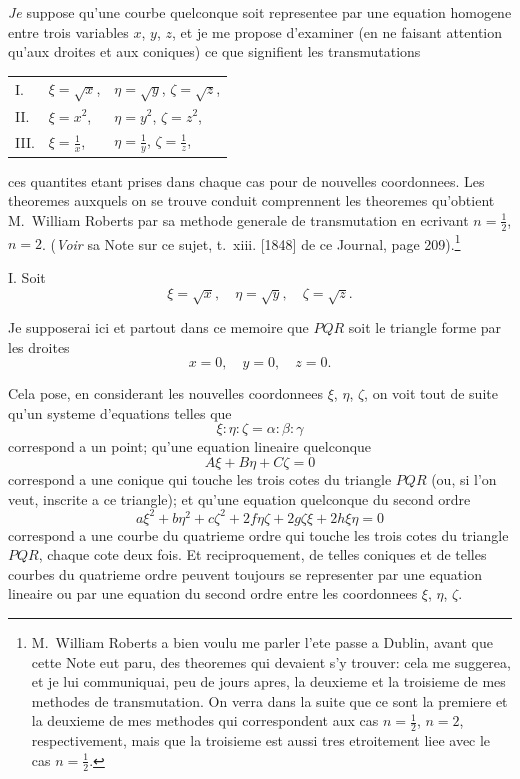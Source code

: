 \documentclass[11pt,a4paper]{book}
\begin{document}
\textit{Je} suppose qu'une courbe quelconque soit representee par une equation homogene entre trois variables $x$, $y$, $z$, et je me propose d'examiner (en ne faisant attention qu'aux droites et aux coniques) ce que signifient les transmutations
\begin{center}
\begin{tabular}{lll}
I. & $\xi = \sqrt{x}$, & $\eta = \sqrt{y}$, \quad $\zeta = \sqrt{z}$, \\[4pt]
II. & $\xi = x^2$, & $\eta = y^2$, \quad $\zeta = z^2$, \\[4pt]
III. & $\displaystyle\xi = \frac{1}{x}$, & $\displaystyle\eta = \frac{1}{y}$, \quad $\displaystyle\zeta = \frac{1}{z}$,
\end{tabular}
\end{center}
ces quantites etant prises dans chaque cas pour de nouvelles coordonnees. Les theoremes auxquels on se trouve conduit comprennent les theoremes qu'obtient M.~William Roberts par sa methode generale de transmutation en ecrivant $n = \frac{1}{2}$, $n = 2$. (\textit{Voir} sa Note sur ce sujet, t.~xiii. [1848] de ce Journal, page 209).\footnote{M.~William Roberts a bien voulu me parler l'ete passe a Dublin, avant que cette Note eut paru, des theoremes qui devaient s'y trouver: cela me suggerea, et je lui communiquai, peu de jours apres, la deuxieme et la troisieme de mes methodes de transmutation. On verra dans la suite que ce sont la premiere et la deuxieme de mes methodes qui correspondent aux cas $n = \frac{1}{2}$, $n = 2$, respectivement, mais que la troisieme est aussi tres etroitement liee avec le cas $n = \frac{1}{2}$.}

\textsc{I.} Soit
\[
\xi = \sqrt{x}, \quad \eta = \sqrt{y}, \quad \zeta = \sqrt{z}.
\]

Je supposerai ici et partout dans ce memoire que $PQR$ soit le triangle forme par les droites
\[
x = 0, \quad y = 0, \quad z = 0.
\]

Cela pose, en considerant les nouvelles coordonnees $\xi$, $\eta$, $\zeta$, on voit tout de suite qu'un systeme d'equations telles que
\[
\xi : \eta : \zeta = \alpha : \beta : \gamma
\]
correspond a un point; qu'une equation lineaire quelconque
\[
A\xi + B\eta + C\zeta = 0
\]
correspond a une conique qui touche les trois cotes du triangle $PQR$ (ou, si l'on veut, inscrite a ce triangle); et qu'une equation quelconque du second ordre
\[
a\xi^2 + b\eta^2 + c\zeta^2 + 2f\eta\zeta + 2g\zeta\xi + 2h\xi\eta = 0
\]
correspond a une courbe du quatrieme ordre qui touche les trois cotes du triangle $PQR$, chaque cote deux fois. Et reciproquement, de telles coniques et de telles courbes du quatrieme ordre peuvent toujours se representer par une equation lineaire ou par une equation du second ordre entre les coordonnees $\xi$, $\eta$, $\zeta$.
\end{document}
